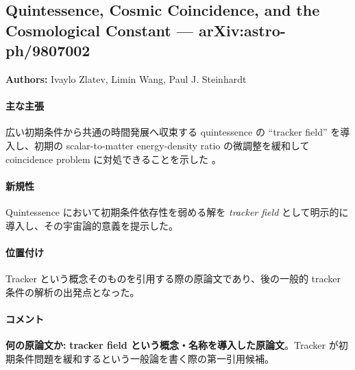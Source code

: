 \subsection{Quintessence, Cosmic Coincidence, and the Cosmological Constant --- arXiv:astro-ph/9807002}

\textbf{Authors:} Ivaylo Zlatev, Limin Wang, Paul J. Steinhardt

\paragraph{主な主張}
広い初期条件から共通の時間発展へ収束する quintessence の ``tracker field'' を導入し、初期の scalar-to-matter energy-density ratio の微調整を緩和して coincidence problem に対処できることを示した \cite{Zlatev:1998tracker}。

\paragraph{新規性}
Quintessence において初期条件依存性を弱める解を \emph{tracker field} として明示的に導入し、その宇宙論的意義を提示した。

\paragraph{位置付け}
Tracker という概念そのものを引用する際の原論文であり、後の一般的 tracker 条件の解析の出発点となった。

\paragraph{コメント}
\textbf{何の原論文か:} \textbf{tracker field という概念・名称を導入した原論文}。Tracker が初期条件問題を緩和するという一般論を書く際の第一引用候補。
